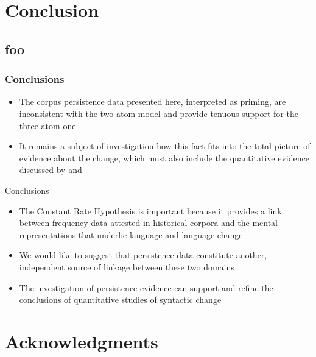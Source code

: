 \documentclass{digs-slides}
\begin{document}
\section{Conclusion}
\label{sec:conclusion}

\subsection*{foo}

\begin{frame}
    \frametitle{Conclusions}
    \begin{itemize}
      \item The corpus persistence data presented here, interpreted as
        priming, are inconsistent with the two-atom model and provide
        tenuous support for the three-atom one


      \item It remains a subject of investigation how this fact fits
        into the total picture of evidence about the change, which must
        also include the quantitative evidence discussed by
        \textcite{Frisch1997} and \textcite{wallage08}
    \end{itemize}
\end{frame}

\begin{frame}{Conclusions}
    \begin{itemize}
      \item The Constant Rate Hypothesis is important because it
        provides a link between frequency data attested in historical
        corpora and the mental representations that underlie language
        and language change
      \item We would like to suggest that persistence data constitute
        another, independent source of linkage between these two domains
      \item The investigation of persistence evidence can support and refine
        the conclusions of quantitative studies of syntactic change
    \end{itemize}
\end{frame}

\appendix{}

\section{Acknowledgments}
\end{document}
